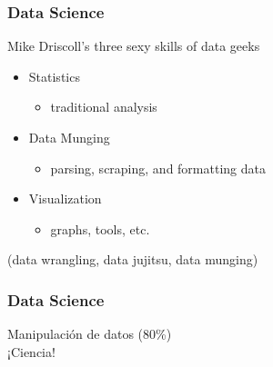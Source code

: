 \documentclass[14pt]{beamer}
\begin{document}
\begin{frame}
  \frametitle{Data Science}

  Mike Driscoll’s three sexy skills of data geeks

  \begin{itemize}
  \item Statistics
    \begin{itemize}
    \item traditional analysis
\end{itemize}
\item Data Munging
  \begin{itemize}
  \item parsing, scraping, and formatting data
\end{itemize}
\item Visualization
  \begin{itemize}
  \item graphs, tools, etc.
\end{itemize}
\end{itemize}

\begin{block}{}
  \begin{center}
    (data wrangling, data jujitsu, data munging)
  \end{center}
\end{block}
\end{frame}


\begin{frame}
  \frametitle{Data Science}


 \vspace*{1em}
 Manipulación de datos (80\%)\\
 ¡Ciencia!\\
\end{frame}
\end{document}
